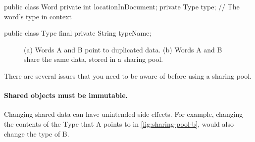 \begin{shortlisting}
public class Word {
	private int  locationInDocument;
	private Type type;  // The word's type in context
}

public class Type {
	final private String typeName;
}
\end{shortlisting}


\begin{figure}
\centering
	\hspace{0.18\textwidth}
	\caption{(a) Words A and B point to duplicated data. (b) Words A and B
    share the same data, stored in a sharing pool.}
	\label{fig:sharing-pool}
\end{figure}


There are several issues that you need to be aware of before using a sharing
pool.
\paragraph{Shared objects must be immutable.} Changing shared data can
have unintended side effects. For example, 
changing the contents of the Type that A points to in
\autoref{fig:sharing-pool-b}, would also change the type of B.

